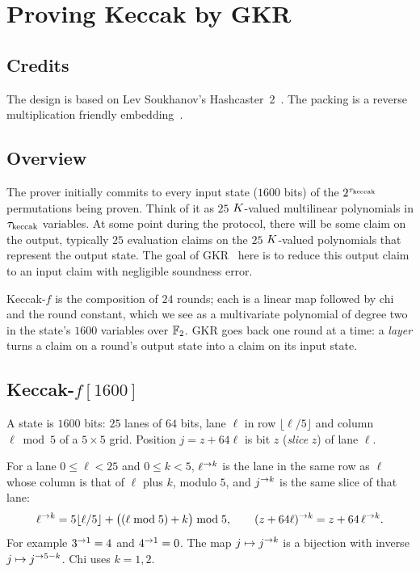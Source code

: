 \section{Proving Keccak by GKR}\label{annex:keccak}

\subsection{Credits}\label{keccak:credits}

The design is based on Lev Soukhanov's Hashcaster~2~\cite{Hashcaster2}. The packing is a reverse multiplication friendly embedding~\cite{CCXY18}.

\subsection{Overview}\label{keccak:overview}

The prover initially commits to every input state ($1600$ bits) of the $2^{\tau_{\mathrm{keccak}}}$ permutations being proven. Think of it as $25$ $K$-valued multilinear polynomials in $\tau_{\mathrm{keccak}}$ variables. At some point during the protocol, there will be some claim on the output, typically $25$ evaluation claims on the $25$ $K$-valued polynomials that represent the output state. The goal of GKR~\cite{GKR08} here is to reduce this output claim to an input claim with negligible soundness error.

Keccak-$f$ is the composition of $24$ rounds; each is a linear map followed by chi and the round constant, which we see as a multivariate polynomial of degree two in the state's $1600$ variables over $\mathbb{F}_2$. GKR goes back one round at a time: a \emph{layer} turns a claim on a round's output state into a claim on its input state.

\subsection{Keccak-\texorpdfstring{$f[1600]$}{f[1600]}}\label{keccak:perm}

A state is $1600$ bits: $25$ lanes of $64$ bits, lane $\ell$ in row $\lfloor\ell/5\rfloor$ and column $\ell\bmod5$ of a $5\times5$ grid. Position $j=z+64\ell$ is bit $z$ (\emph{slice} $z$) of lane $\ell$.

For a lane $0\le\ell<25$ and $0\le k<5$, $\ell^{\rightarrow k}$ is the lane in the same row as $\ell$ whose column is that of $\ell$ plus $k$, modulo $5$, and $j^{\rightarrow k}$ is the same slice of that lane:
\[
\ell^{\rightarrow k}=5\lfloor\ell/5\rfloor+\bigl((\ell\bmod5)+k\bigr)\bmod5,\qquad (z+64\ell)^{\rightarrow k}=z+64\,\ell^{\rightarrow k}.
\]
For example $3^{\rightarrow 1}=4$ and $4^{\rightarrow 1}=0$. The map $j\mapsto j^{\rightarrow k}$ is a bijection with inverse $j\mapsto j^{\rightarrow 5-k}$. Chi uses $k=1,2$.

